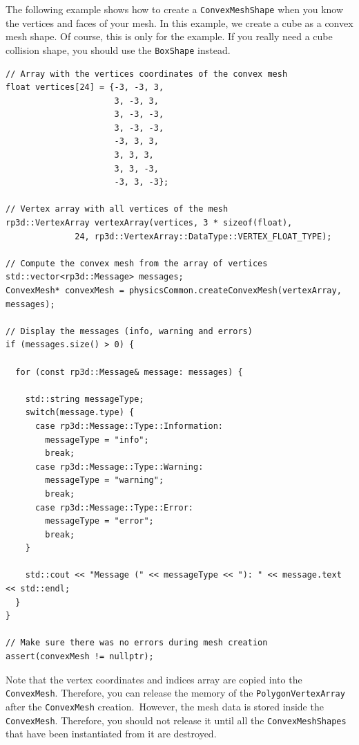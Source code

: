 \documentclass[a4paper,12pt]{article}
\begin{document}
    The following example shows how to create a \texttt{ConvexMeshShape} when you know the vertices and faces of your mesh.
    In this example, we create a cube as a convex mesh shape. Of course, this is only for the example. If you really need a cube collision
    shape, you should use the \texttt{BoxShape} instead. \\

    \begin{lstlisting}
// Array with the vertices coordinates of the convex mesh
float vertices[24] = {-3, -3, 3,
                      3, -3, 3,
                      3, -3, -3,
                      3, -3, -3,
                      -3, 3, 3,
                      3, 3, 3,
                      3, 3, -3,
                      -3, 3, -3};

// Vertex array with all vertices of the mesh
rp3d::VertexArray vertexArray(vertices, 3 * sizeof(float),
			  24, rp3d::VertexArray::DataType::VERTEX_FLOAT_TYPE);

// Compute the convex mesh from the array of vertices
std::vector<rp3d::Message> messages;
ConvexMesh* convexMesh = physicsCommon.createConvexMesh(vertexArray, messages);

// Display the messages (info, warning and errors)
if (messages.size() > 0) {

  for (const rp3d::Message& message: messages) {

    std::string messageType;
    switch(message.type) {
      case rp3d::Message::Type::Information:
        messageType = "info";
        break;
      case rp3d::Message::Type::Warning:
        messageType = "warning";
        break;
      case rp3d::Message::Type::Error:
        messageType = "error";
        break;
    }

    std::cout << "Message (" << messageType << "): " << message.text << std::endl;
  }
}

// Make sure there was no errors during mesh creation
assert(convexMesh != nullptr);

    \end{lstlisting}

    \vspace{0.6cm}

    Note that the vertex coordinates and indices array are copied into the \texttt{ConvexMesh}. Therefore, you can release the memory of the
    \texttt{PolygonVertexArray} after the \texttt{ConvexMesh} creation. However, the mesh data is stored inside the \texttt{ConvexMesh}. Therefore,
    you should not release it until all the \texttt{ConvexMeshShapes} that have been instantiated from it are destroyed. \\
\end{document}
